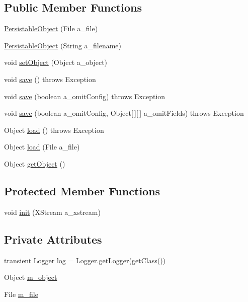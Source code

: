 \subsection*{Public Member Functions}
\begin{DoxyCompactItemize}
\item 
\hyperlink{classorg_1_1jgap_1_1util_1_1_persistable_object_a013b0c7f415288f1b1180a3429516043}{Persistable\-Object} (File a\-\_\-file)
\item 
\hyperlink{classorg_1_1jgap_1_1util_1_1_persistable_object_a16f446e5ad56e8d3b571c812f1ac57ac}{Persistable\-Object} (String a\-\_\-filename)
\item 
void \hyperlink{classorg_1_1jgap_1_1util_1_1_persistable_object_a425d3f701ee2c004d48428947b51f7cf}{set\-Object} (Object a\-\_\-object)
\item 
void \hyperlink{classorg_1_1jgap_1_1util_1_1_persistable_object_aa61d2521b87340a582599666da5a967c}{save} ()  throws Exception 
\item 
void \hyperlink{classorg_1_1jgap_1_1util_1_1_persistable_object_ac2d6f552c42fdc460d5743bf0277f32c}{save} (boolean a\-\_\-omit\-Config)  throws Exception 
\item 
void \hyperlink{classorg_1_1jgap_1_1util_1_1_persistable_object_a9524686560a1844ee533eb647ff5f4e0}{save} (boolean a\-\_\-omit\-Config, Object\mbox{[}$\,$\mbox{]}\mbox{[}$\,$\mbox{]} a\-\_\-omit\-Fields)  throws Exception 
\item 
Object \hyperlink{classorg_1_1jgap_1_1util_1_1_persistable_object_a183bc37d2dd9689275883c765a3c94af}{load} ()  throws Exception 
\item 
Object \hyperlink{classorg_1_1jgap_1_1util_1_1_persistable_object_a119725132e2648230984e95816783b9e}{load} (File a\-\_\-file)
\item 
Object \hyperlink{classorg_1_1jgap_1_1util_1_1_persistable_object_a934a65d7ac5eeb53ed073a9d4315f048}{get\-Object} ()
\end{DoxyCompactItemize}
\subsection*{Protected Member Functions}
\begin{DoxyCompactItemize}
\item 
void \hyperlink{classorg_1_1jgap_1_1util_1_1_persistable_object_a23744dd53806553fe274b987dc166c74}{init} (X\-Stream a\-\_\-xstream)
\end{DoxyCompactItemize}
\subsection*{Private Attributes}
\begin{DoxyCompactItemize}
\item 
transient Logger \hyperlink{classorg_1_1jgap_1_1util_1_1_persistable_object_a0ac7a597870afd446b102f84c7564408}{log} = Logger.\-get\-Logger(get\-Class())
\item 
Object \hyperlink{classorg_1_1jgap_1_1util_1_1_persistable_object_a148fd38406ea69f0d91f4a6c0edc5d19}{m\-\_\-object}
\item 
File \hyperlink{classorg_1_1jgap_1_1util_1_1_persistable_object_a92029c1701d5e33a133b99a4c49f1c2d}{m\-\_\-file}
\end{DoxyCompactItemize}
